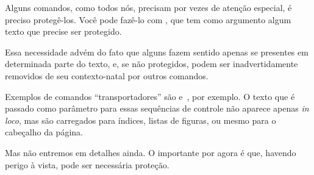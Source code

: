Alguns comandos, como todos nós, precisam por vezes de atenção
especial, é preciso protegê-los. Você pode fazê-lo com
\macroCall{\protect}, que tem como argumento algum texto que precise
ser protegido.

Essa necessidade advém do fato que alguns fazem sentido apenas
se presentes em determinada parte do texto, e, se não protegidos,
podem ser inadvertidamente removidos de seu contexto-natal por outros
comandos.

Exemplos de comandos ``transportadores'' são 
e~, por exemplo. O texto que é passado como
parâmetro para essas sequências de controle não aparece apenas \emph{in loco},
mas são carregados para índices, listas de figuras, ou mesmo para o
cabeçalho da página.

Mas não entremos em detalhes ainda. O importante por agora é que,
havendo perigo à vista, pode ser necessária proteção.
